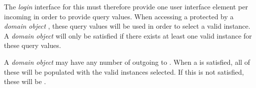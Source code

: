 The \textit{login} interface for this  must therefore provide one user interface element per incoming  in order to provide query values. When accessing a  protected by a \textit{domain object} , these query values will be used in order to select a valid instance. A \textit{domain object}  will only be satisfied if there exists at least one valid instance for these query values.

A \textit{domain object}  may have any number of outgoing  to . When a  is satisfied, all of these  will be populated with the valid  instances selected. If this  is not satisfied, these  will be .
